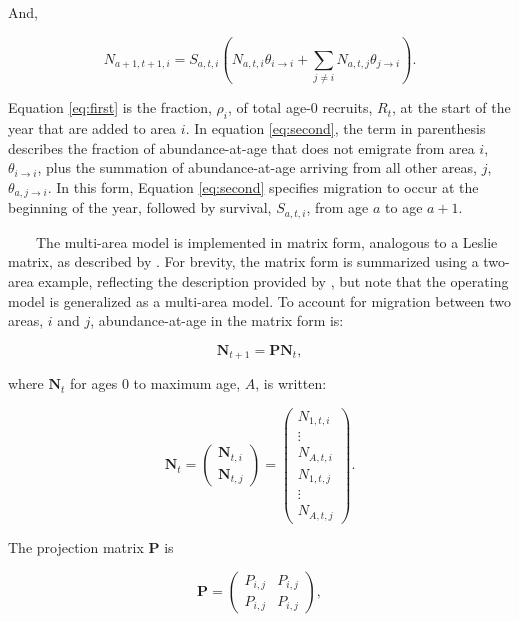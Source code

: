 \documentclass[
]{book}
\begin{document}
And,

\[
N_{a+1,t+1,i} = S_{a,t,i} \left(N_{a,t,i}\theta_{i \rightarrow i}+\sum_{j \neq i} N_{a,t,j}\theta_{j \rightarrow i}\right). \tag{eq. 2} \label{eq:second}
\]

Equation \ref{eq:first} is the fraction, \(\rho_i\), of total age-0 recruits, \(R_t\), at the start of the year that are added to area \(i\). In equation \ref{eq:second}, the term in parenthesis describes the fraction of abundance-at-age that does not emigrate from area \(i\), \(\theta_{i \rightarrow i}\), plus the summation of abundance-at-age arriving from all other areas, \(j\), \(\theta_{a,j \rightarrow i}\). In this form, Equation \ref{eq:second} specifies migration to occur at the beginning of the year, followed by survival, \(S_{a,t,i}\), from age \(a\) to age \(a+1\).\\
\strut ~~~~The multi-area model is implemented in matrix form, analogous to a Leslie matrix, as described by \citet{quinn_quantitative_1999}. For brevity, the matrix form is summarized using a two-area example, reflecting the description provided by \citet{quinn_quantitative_1999}, but note that the operating model is generalized as a multi-area model. To account for migration between two areas, \(i\) and \(j\), abundance-at-age in the matrix form is:

\[
\mathbf{N}_{t+1} = \mathbf{P}\mathbf{N}_t, \tag{eq. 3} \label{eq:third}
\]

where \(\mathbf{N}_t\) for ages 0 to maximum age, \(A\), is written:

\[
\mathbf{N}_t =
\begin{pmatrix}
\mathbf{N}_{t,i} \\
\mathbf{N}_{t,j}
\end{pmatrix}
=
\begin{pmatrix}
N_{1,t,i} \\
\vdots \\
N_{A,t,i} \\
N_{1,t,j} \\
\vdots \\
N_{A,t,j}
\end{pmatrix}.
\tag{eq. 4} \label{eq:fourth}
\]

The projection matrix \(\mathbf{P}\) is

\[
\mathbf{P} = \begin{pmatrix}
P_{i,j} & P_{i,j} \\
P_{i,j} & P_{i,j}
\end{pmatrix}, \tag{eq. 5} \label{eq:fifth}
\]
\end{document}
